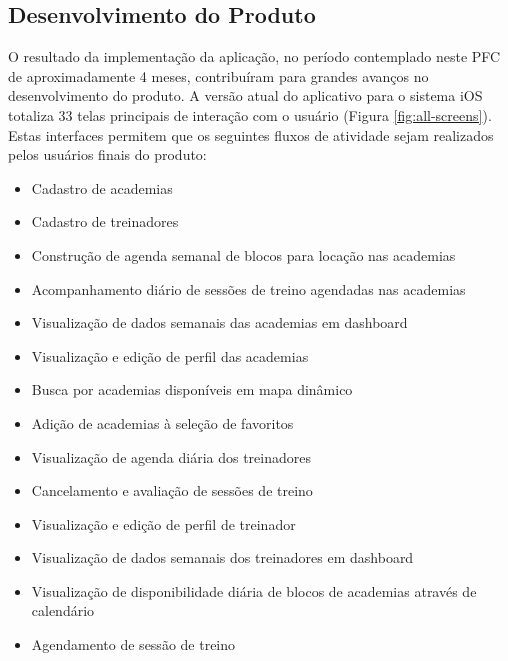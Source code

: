 \subsection{Desenvolvimento do Produto}
O resultado da implementação da aplicação, no período contemplado neste PFC de aproximadamente 4 meses, contribuíram para grandes avanços no desenvolvimento do produto. A versão atual do aplicativo para o sistema iOS totaliza 33 telas principais de interação com o usuário (Figura \ref{fig:all-screens}). Estas interfaces permitem que os seguintes fluxos de atividade sejam realizados pelos usuários finais do produto:

\begin{itemize}
    \item Cadastro de academias
    \item Cadastro de treinadores
    \item Construção de agenda semanal de blocos para locação nas academias
    \item Acompanhamento diário de sessões de treino agendadas nas academias
    \item Visualização de dados semanais das academias em dashboard
    \item Visualização e edição de perfil das academias
    \item Busca por academias disponíveis em mapa dinâmico
    \item Adição de academias à seleção de favoritos
    \item Visualização de agenda diária dos treinadores
    \item Cancelamento e avaliação de sessões de treino
    \item Visualização e edição de perfil de treinador
    \item Visualização de dados semanais dos treinadores em dashboard
    \item Visualização de disponibilidade diária de blocos de academias através de calendário
    \item Agendamento de sessão de treino
\end{itemize}

